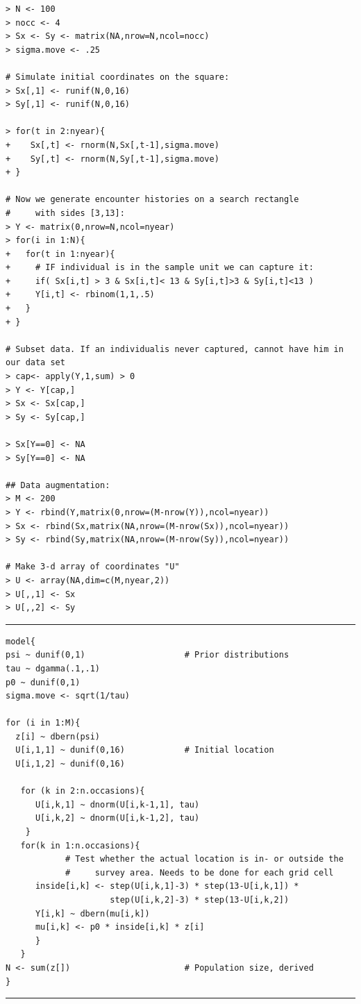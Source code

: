 {\small
\begin{verbatim}
> N <- 100
> nocc <- 4
> Sx <- Sy <- matrix(NA,nrow=N,ncol=nocc)
> sigma.move <- .25

# Simulate initial coordinates on the square:
> Sx[,1] <- runif(N,0,16)
> Sy[,1] <- runif(N,0,16)

> for(t in 2:nyear){
+    Sx[,t] <- rnorm(N,Sx[,t-1],sigma.move)
+    Sy[,t] <- rnorm(N,Sy[,t-1],sigma.move)
+ }

# Now we generate encounter histories on a search rectangle 
#     with sides [3,13]:
> Y <- matrix(0,nrow=N,ncol=nyear)
> for(i in 1:N){
+   for(t in 1:nyear){
+     # IF individual is in the sample unit we can capture it:
+     if( Sx[i,t] > 3 & Sx[i,t]< 13 & Sy[i,t]>3 & Sy[i,t]<13 )
+     Y[i,t] <- rbinom(1,1,.5)
+   }
+ }

# Subset data. If an individualis never captured, cannot have him in our data set
> cap<- apply(Y,1,sum) > 0
> Y <- Y[cap,]
> Sx <- Sx[cap,]
> Sy <- Sy[cap,]

> Sx[Y==0] <- NA
> Sy[Y==0] <- NA

## Data augmentation:
> M <- 200
> Y <- rbind(Y,matrix(0,nrow=(M-nrow(Y)),ncol=nyear))
> Sx <- rbind(Sx,matrix(NA,nrow=(M-nrow(Sx)),ncol=nyear))
> Sy <- rbind(Sy,matrix(NA,nrow=(M-nrow(Sy)),ncol=nyear))

# Make 3-d array of coordinates "U"
> U <- array(NA,dim=c(M,nyear,2))
> U[,,1] <- Sx
> U[,,2] <- Sy
\end{verbatim}
}

\begin{panel}[htp]
\centering
\rule[0.15in]{\textwidth}{.03in}
{\small
\begin{verbatim}
model{
psi ~ dunif(0,1)                    # Prior distributions
tau ~ dgamma(.1,.1)
p0 ~ dunif(0,1)
sigma.move <- sqrt(1/tau)

for (i in 1:M){
  z[i] ~ dbern(psi)
  U[i,1,1] ~ dunif(0,16)            # Initial location
  U[i,1,2] ~ dunif(0,16)

   for (k in 2:n.occasions){
      U[i,k,1] ~ dnorm(U[i,k-1,1], tau)
      U[i,k,2] ~ dnorm(U[i,k-1,2], tau)
    }
   for(k in 1:n.occasions){
            # Test whether the actual location is in- or outside the
            #     survey area. Needs to be done for each grid cell
      inside[i,k] <- step(U[i,k,1]-3) * step(13-U[i,k,1]) *
                     step(U[i,k,2]-3) * step(13-U[i,k,2])
      Y[i,k] ~ dbern(mu[i,k])
      mu[i,k] <- p0 * inside[i,k] * z[i]
      }
   }
N <- sum(z[])                       # Population size, derived
}
\end{verbatim}
}
\rule[-0.15in]{\textwidth}{.03in}
\caption{
{\bf BUGS} model specification for the uniform search intensity model
similar
to Royle and Young (2008) but with a random walk movement model.
help file \mbox{\tt ?uniform$\_$search} in the {\bf R} package \mbox{\tt scrbook}.
}
\label{search-encounter.panel.uniform}
\end{panel}

